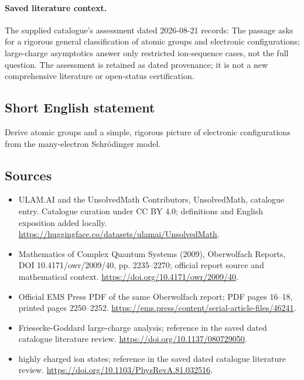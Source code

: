 \documentclass[11pt]{article}
\begin{document}
\paragraph{Saved literature context.} The supplied catalogue's assessment dated 2026-08-21 records: The passage asks for a rigorous general classification of atomic groups and electronic configurations; large-charge asymptotics answer only restricted ion-sequence cases, not the full question. The assessment is retained as dated provenance; it is not a new comprehensive literature or open-status certification.
\subsection{Short English statement}
Derive atomic groups and a simple, rigorous picture of electronic configurations from the many-electron Schrödinger model.
\subsection{Sources}
\begin{itemize}
\item[\hypertarget{source:statement:1}{S1}] ULAM.AI and the UnsolvedMath Contributors, UnsolvedMath, catalogue entry. Catalogue curation under CC BY 4.0; definitions and English exposition added locally.
\url{https://huggingface.co/datasets/ulamai/UnsolvedMath}.
\item[\hypertarget{source:statement:2}{S2}] Mathematics of Complex Quantum Systems (2009), Oberwolfach Reports, DOI 10.4171/owr/2009/40, pp. 2235--2270; official report source and mathematical context.
\url{https://doi.org/10.4171/owr/2009/40}.
\item[\hypertarget{source:statement:3}{S3}] Official EMS Press PDF of the same Oberwolfach report; PDF pages 16--18, printed pages 2250--2252.
\url{https://ems.press/content/serial-article-files/46241}.
\item[\hypertarget{source:statement:4}{S4}] Friesecke-Goddard large-charge analysis; reference in the saved dated catalogue literature review.
\url{https://doi.org/10.1137/080729050}.
\item[\hypertarget{source:statement:5}{S5}] highly charged ion states; reference in the saved dated catalogue literature review.
\url{https://doi.org/10.1103/PhysRevA.81.032516}.
\end{itemize}
\label{end:statement}
\end{document}
